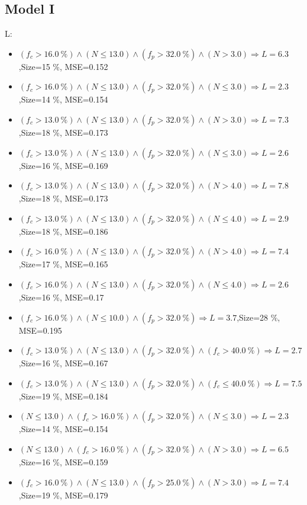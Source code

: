 \documentclass[numbered]{CSL}
\begin{document}
\subsection{Model I}
L:
\begin{itemize}
\item $(f_c > 16.0~\%) \land (N \leq 13.0) \land (f_p > 32.0~\%) \land (N > 3.0) \Rightarrow L = 6.3$,\hfill Size=15 \%, MSE=0.152
\item $(f_c > 16.0~\%) \land (N \leq 13.0) \land (f_p > 32.0~\%) \land (N \leq 3.0) \Rightarrow L = 2.3$,\hfill Size=14 \%, MSE=0.154
\item $(f_c > 13.0~\%) \land (N \leq 13.0) \land (f_p > 32.0~\%) \land (N > 3.0) \Rightarrow L = 7.3$,\hfill Size=18 \%, MSE=0.173
\item $(f_c > 13.0~\%) \land (N \leq 13.0) \land (f_p > 32.0~\%) \land (N \leq 3.0) \Rightarrow L = 2.6$,\hfill Size=16 \%, MSE=0.169
\item $(f_c > 13.0~\%) \land (N \leq 13.0) \land (f_p > 32.0~\%) \land (N > 4.0) \Rightarrow L = 7.8$,\hfill Size=18 \%, MSE=0.173
\item $(f_c > 13.0~\%) \land (N \leq 13.0) \land (f_p > 32.0~\%) \land (N \leq 4.0) \Rightarrow L = 2.9$,\hfill Size=18 \%, MSE=0.186
\item $(f_c > 16.0~\%) \land (N \leq 13.0) \land (f_p > 32.0~\%) \land (N > 4.0) \Rightarrow L = 7.4$,\hfill Size=17 \%, MSE=0.165
\item $(f_c > 16.0~\%) \land (N \leq 13.0) \land (f_p > 32.0~\%) \land (N \leq 4.0) \Rightarrow L = 2.6$,\hfill Size=16 \%, MSE=0.17
\item $(f_c > 16.0~\%) \land (N \leq 10.0) \land (f_p > 32.0~\%) \Rightarrow L = 3.7$,\hfill Size=28 \%, MSE=0.195
\item $(f_c > 13.0~\%) \land (N \leq 13.0) \land (f_p > 32.0~\%) \land (f_c > 40.0~\%) \Rightarrow L = 2.7$,\hfill Size=16 \%, MSE=0.167
\item $(f_c > 13.0~\%) \land (N \leq 13.0) \land (f_p > 32.0~\%) \land (f_c \leq 40.0~\%) \Rightarrow L = 7.5$,\hfill Size=19 \%, MSE=0.184
\item $(N \leq 13.0) \land (f_c > 16.0~\%) \land (f_p > 32.0~\%) \land (N \leq 3.0) \Rightarrow L = 2.3$,\hfill Size=14 \%, MSE=0.154
\item $(N \leq 13.0) \land (f_c > 16.0~\%) \land (f_p > 32.0~\%) \land (N > 3.0) \Rightarrow L = 6.5$,\hfill Size=16 \%, MSE=0.159
\item $(f_c > 16.0~\%) \land (N \leq 13.0) \land (f_p > 25.0~\%) \land (N > 3.0) \Rightarrow L = 7.4$,\hfill Size=19 \%, MSE=0.179

\end{itemize}
\end{document}
